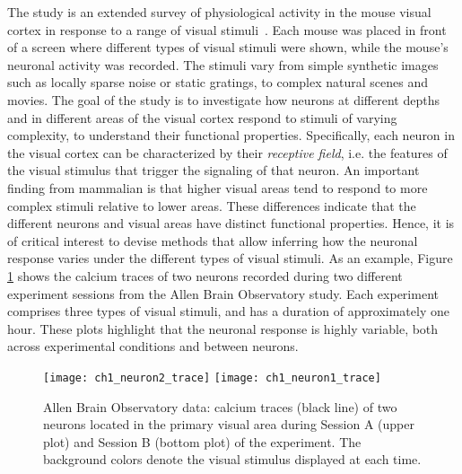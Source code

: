 The study is an extended survey of physiological activity in the mouse visual cortex in response to a range of visual stimuli~\parencite{allen_stimulus}. Each mouse was placed in front of a screen where different types of visual stimuli were shown, while the mouse’s neuronal activity was recorded. The stimuli vary from simple synthetic images such as locally sparse noise or static gratings, to complex natural scenes and movies.
The goal of the study is to investigate how neurons at different depths and in different areas of the visual cortex respond to stimuli of varying complexity, to understand their functional properties. Specifically, each neuron in the visual cortex can be characterized by their \textit{receptive field}, i.e. the features of the visual stimulus that trigger the signaling of that neuron. 
An important finding from mammalian is that higher visual areas tend to respond to more complex stimuli relative to lower areas. These differences indicate that the different neurons and visual areas have distinct functional properties.
Hence, it is of critical interest to devise methods that allow inferring how the neuronal response varies under the different types of visual stimuli. %
As an example, Figure \ref{ch1_fig:trace_neurons} shows the calcium traces of two neurons recorded during two different experiment sessions from the Allen Brain Observatory study.
Each experiment comprises three types of visual stimuli, and has a duration of approximately one hour.
These plots highlight that the neuronal response is highly variable, both across experimental conditions and between neurons.

\begin{figure}
	\centering
	\texttt{[image: ch1\_neuron2\_trace]}
	\centering
	\texttt{[image: ch1\_neuron1\_trace]}
	\caption[Calcium traces of two neurons from the Allen Brain Observatory data.]{Allen Brain Observatory data: calcium traces (black line) of two neurons located in the primary visual area during Session A (upper plot) and Session B (bottom plot) of the experiment. The background colors denote the visual stimulus displayed at each time.}\label{ch1_fig:trace_neurons}
\end{figure}

